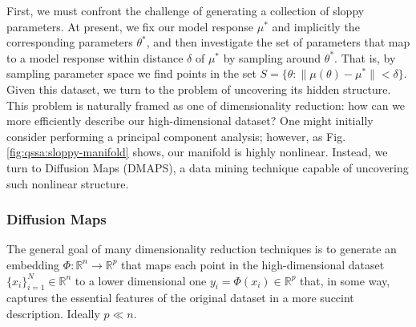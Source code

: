 \documentclass{article}
\newcommand{\ssep}{:}
\newcommand{\omr}{\mu}
\begin{document}

First, we must confront the challenge of generating a collection of
sloppy parameters. At present, we fix our model response $\omr^*$ and
implicitly the corresponding parameters $\theta^*$, and then
investigate the set of parameters that map to a model response within
distance $\delta$ of $\omr^*$ by sampling around $\theta^*$. That is,
by sampling parameter space we find points in the set
$S = \{\theta \ssep  \| \omr(\theta) - \omr^* \| < \delta \}$. \\

Given this dataset, we turn to the problem of uncovering its hidden structure. This
problem is naturally framed as one of dimensionality reduction: how
can we more efficiently describe our high-dimensional dataset? One
might initially consider performing a principal component analysis;
however, as Fig. \ref{fig:qssa:sloppy-manifold} shows, our manifold is
highly nonlinear. Instead, we turn to Diffusion Maps (DMAPS), a data mining
technique capable of uncovering such nonlinear structure. \\

\subsubsection{Diffusion Maps}

The general goal of many dimensionality reduction techniques is to generate
an embedding $\Phi : \mathbb{R}^n \rightarrow \mathbb{R}^p$ that maps
each point in the high-dimensional dataset $\{ x_i \}_{i=1}^N \in
\mathbb{R}^n$ to a lower dimensional one $y_i = \Phi(x_i) \in
\mathbb{R}^p$ that, in some way, captures the essential features of
the original dataset in a more succint description. Ideally $p \ll
n$. \\
\end{document}
